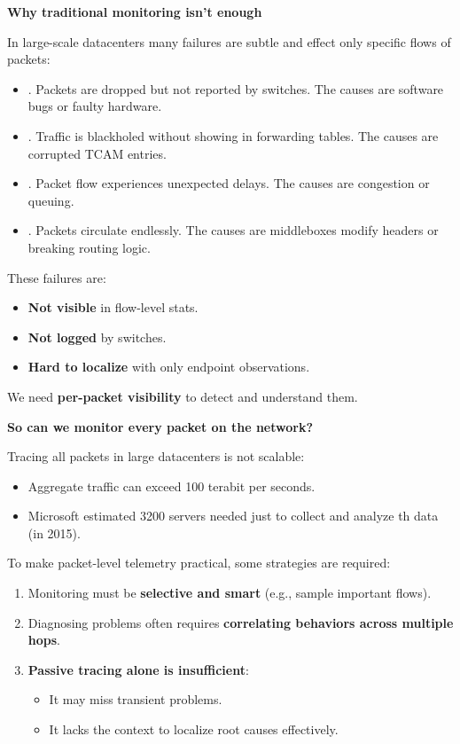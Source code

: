 \highspace
\begin{flushleft}
    \textcolor{Red2}{ \textbf{Why traditional monitoring isn't enough}}
\end{flushleft}
In large-scale datacenters many failures are subtle and effect only specific flows of packets:
\begin{itemize}
    \item {}. Packets are dropped but not reported by switches. The causes are software bugs or faulty hardware.
    \item {}. Traffic is blackholed without showing in forwarding tables. The causes are corrupted TCAM entries.
    \item {}. Packet flow experiences unexpected delays. The causes are congestion or queuing.
    \item {}. Packets circulate endlessly. The causes are middleboxes modify headers or breaking routing logic.
\end{itemize}
These failures are:
\begin{itemize}
    \item \textbf{Not visible} in flow-level stats.
    \item \textbf{Not logged} by switches.
    \item \textbf{Hard to localize} with only endpoint observations.
\end{itemize}
\textcolor{Green3}{} We need \textcolor{Green3}{\textbf{per-packet visibility}} to detect and understand them.

\highspace
\begin{flushleft}
    \textcolor{Green3}{ \textbf{So can we monitor every packet on the network?}}
\end{flushleft}
Tracing all packets in large datacenters is not scalable:
\begin{itemize}
    \item Aggregate traffic can exceed 100 terabit per seconds.
    \item Microsoft estimated 3200 servers needed just to collect and analyze th data (in 2015).
\end{itemize}
To make packet-level telemetry practical, some strategies are required:
\begin{enumerate}
    \item Monitoring must be \textbf{selective and smart} (e.g., sample important flows).
    \item Diagnosing problems  often requires \textbf{correlating behaviors across multiple hops}.
    \item \textbf{Passive tracing alone is insufficient}:
    \begin{itemize}
        \item It may miss transient problems.
        \item It lacks the context to localize root causes effectively.
    \end{itemize}
\end{enumerate}